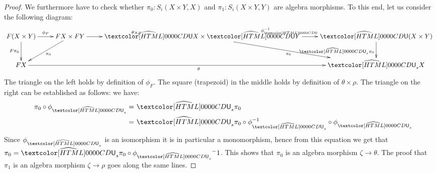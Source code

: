 \begin{proof}
  We furthermore have to check whether $\pi_0 : S_i (X \times Y, X)$
  and $\pi_1 : S_i (X \times Y, Y)$ are algebra morphisms. To this
  end, let us consider the following diagram:
  $$
  \xymatrix{
    F(X \times Y) \ar[r]^{\phi_F} \ar[d]_{F \pi_0}
    &FX \times FY \ar[r]^{\theta \times \rho} \ar[dl]^{\pi_0}
    &\extendfunc{\Und}X \times \extendfunc{\Und}Y \ar[r]^{\phi_{\Und}^{-1}} \ar[dr]_{\pi_0}
    &\extendfunc{\Und}(X \times Y) \ar[d]_{\extendfunc{\Und}_s \pi_0}
    \\
    FX \ar[rrr]_{\theta} &&&\extendfunc{\Und}_s X
  }
  $$
  The triangle on the left holds by definition of $\phi_F$. The square
  (trapezoid) in the middle holds by definition of
  $\theta \times \rho$. The triangle on the right can be established
  as follows: we have:
  \begin{align*}
    &&\pi_0 \circ \phi_{\extendfunc{\Und}_s} =&\ \extendfunc{\Und}_s \pi_0 \\
    &&=&\ \extendfunc{\Und}_s \pi_0 \circ \phi_{\extendfunc{\Und}_s}^{-1} \circ \phi_{\extendfunc{\Und}_s}
  \end{align*}
  Since $\phi_{\extendfunc{\Und}_s}$ is an isomorphism it is in particular a monomorphism,
  hence from this equation we get that
  $\pi_0 = \extendfunc{\Und}_s \pi_0 \circ \phi_{\extendfunc{\Und}_s}{^-1}$. This shows that $\pi_0$ is an
  algebra morphism $\zeta \to \theta$. The proof that $\pi_1$ is an
  algebra morphism $\zeta \to \rho$ goes along the same lines.


\end{proof}
